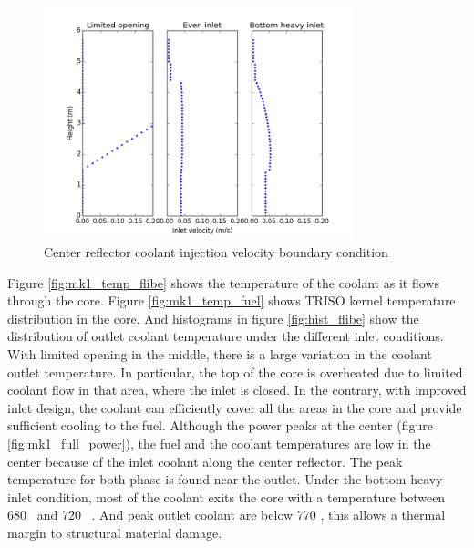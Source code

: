 \documentclass{elsarticle}
\begin{document}
\begin{figure}
    \centering
    \includegraphics[width=0.8\textwidth]{images/diffusion/mk1/SS/flow_opti/inlet_vel.png}
    \caption{Center reflector coolant injection velocity boundary condition}
    \label{fig:inlet_vel}
\end{figure}

Figure \ref{fig:mk1_temp_flibe} shows the temperature of the coolant as it flows through the core.
Figure \ref{fig:mk1_temp_fuel} shows TRISO kernel temperature distribution in the core.
And histograms in figure \ref{fig:hist_flibe} show the distribution of outlet coolant temperature under the different inlet conditions.
With limited opening in the middle, there is a large variation in the coolant outlet temperature.
In particular, the top of the core is overheated due to limited coolant flow in that area, where the inlet is closed.
In the contrary, with improved inlet design, the coolant can efficiently cover all the areas in the core and provide sufficient cooling to the fuel. 
Although the power peaks at the center (figure \ref{fig:mk1_full_power}), the fuel and the coolant temperatures are low in the center because of the inlet coolant along the center reflector. The peak temperature for both phase is found near the outlet.
Under the bottom heavy inlet condition, most of the coolant exits the core with a temperature between 680 \degc\ and 720 \degc\ . And peak outlet coolant are below 770 \degc, this allows a thermal margin to structural material damage.
\end{document}
